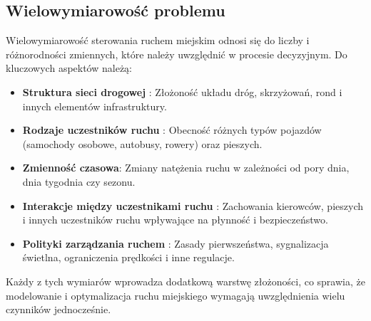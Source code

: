 \documentclass[12pt, a4paper]{article} %
\begin{document}
    \subsection{Wielowymiarowość problemu}

    Wielowymiarowość sterowania ruchem miejskim odnosi się do liczby i różnorodności zmiennych, które należy uwzględnić
    w procesie decyzyjnym. Do kluczowych aspektów należą:

    \begin{itemize}
        \item \textbf{Struktura sieci drogowej}
        : Złożoność układu dróg, skrzyżowań, rond i innych elementów infrastruktury.
        \item \textbf{Rodzaje uczestników ruchu}
        : Obecność różnych typów pojazdów (samochody osobowe, autobusy, rowery) oraz pieszych.
        \item \textbf{Zmienność czasowa}: Zmiany natężenia ruchu w zależności od pory dnia, dnia tygodnia czy sezonu.
        \item \textbf{Interakcje między uczestnikami ruchu}
        : Zachowania kierowców, pieszych i innych uczestników ruchu wpływające na płynność i bezpieczeństwo.
        \item \textbf{Polityki zarządzania ruchem}
        : Zasady pierwszeństwa, sygnalizacja świetlna, ograniczenia prędkości i inne regulacje.
    \end{itemize}

    Każdy z tych wymiarów wprowadza dodatkową warstwę złożoności, co sprawia, że modelowanie i optymalizacja ruchu
    miejskiego wymagają uwzględnienia wielu czynników jednocześnie.

%
%
\end{document}
